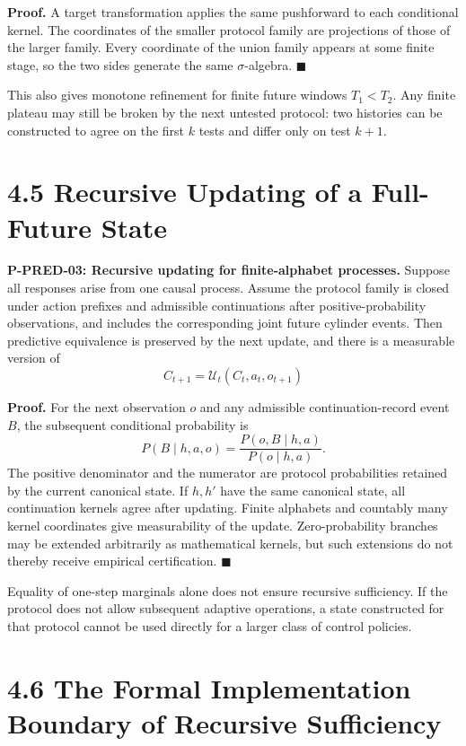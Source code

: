 \documentclass[
  english,
  11pt,
  oneside]{book}
\begin{document}
\textbf{Proof.} A target transformation applies the same pushforward to each conditional kernel. The coordinates of the smaller protocol family are projections of those of the larger family. Every coordinate of the union family appears at some finite stage, so the two sides generate the same \(\sigma\)-algebra. \(\blacksquare\)

This also gives monotone refinement for finite future windows \(T_1<T_2\). Any finite plateau may still be broken by the next untested protocol: two histories can be constructed to agree on the first \(k\) tests and differ only on test \(k+1\).

\section{4.5 Recursive Updating of a Full-Future State}\label{recursive-updating-of-a-full-future-state}

\hypertarget{p-pred-03}{}\label{p-pred-03}

\textbf{P-PRED-03: Recursive updating for finite-alphabet processes.} Suppose all responses arise from one causal process. Assume the protocol family is closed under action prefixes and admissible continuations after positive-probability observations, and includes the corresponding joint future cylinder events. Then predictive equivalence is preserved by the next update, and there is a measurable version of \[C_{t+1}=\mathcal U_t(C_t,a_t,o_{t+1})\]

\textbf{Proof.} For the next observation \(o\) and any admissible continuation-record event \(B\), the subsequent conditional probability is \[P(B\mid h,a,o)
=\frac{P(o,B\mid h,a)}{P(o\mid h,a)}.\] The positive denominator and the numerator are protocol probabilities retained by the current canonical state. If \(h,h'\) have the same canonical state, all continuation kernels agree after updating. Finite alphabets and countably many kernel coordinates give measurability of the update. Zero-probability branches may be extended arbitrarily as mathematical kernels, but such extensions do not thereby receive empirical certification. \(\blacksquare\)

Equality of one-step marginals alone does not ensure recursive sufficiency. If the protocol does not allow subsequent adaptive operations, a state constructed for that protocol cannot be used directly for a larger class of control policies.

\section{4.6 The Formal Implementation Boundary of Recursive Sufficiency}\label{the-formal-implementation-boundary-of-recursive-sufficiency}
\end{document}
